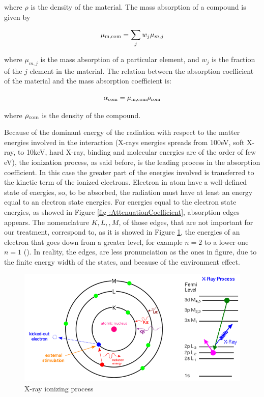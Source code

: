 \begin{flushleft}
where $\rho $ is the density of the material. The mass absorption of a compound is given by
\end{flushleft}
\begin{equation}
\mu \textsubscript{m,com} = \sum_{j} w_j \mu_{m,j}
\label{eq: mu_com}
\end{equation}
\begin{flushleft}
where $\mu_{m,j} $ is the mass absorption of a particular element, and $w_j $ is the fraction of the $j $ element in the material. The relation between the absorption coefficient of the material and the mass absorption coefficient is:
\end{flushleft}
\begin{equation}
\alpha \textsubscript{com} = \mu \textsubscript{m,com} \rho \textsubscript{com}
\label{eq: alpha com}
\end{equation}
\begin{flushleft}
where $\rho \textsubscript{com}$ is the density of the compound.
\end{flushleft}
Because of the dominant energy of the radiation with respect to the matter energies involved in the interaction (X-rays energies spreads from 100eV, soft X-ray, to 10keV, hard X-ray, binding and molecular energies are of the order of few eV), the ionization process, as said before, is the leading process in the absorption coefficient. In this case the greater part of the energies involved is transferred to the kinetic term of the ionized electrons. Electron in atom have a well-defined state of energies, so, to be absorbed, the radiation must have at least an energy equal to an electron state energies. For energies equal to the electron state energies, as showed in Figure \ref{fig :AttenuationCoefficient}, absorption edges appears. The nomenclature $K,L,,M $, of those edges, that are not important for our treatment, correspond to, as it is showed in Figure \ref{fig: KLM}, the energies of an electron that goes down from a greater level, for example $n=2 $ to a lower one $n=1 $ (\cite{agarwal1991interaction}). In reality, the edges, are less pronunciation as the ones in figure, due to the finite energy width of the states, and because of the environment effect.
\\
\begin{figure}[]
%
\centering
%
\includegraphics[width=.6\textwidth]{Immagini/Chapter1/KLM}
%
\caption{X-ray ionizing process}
%
\label{fig: KLM}
%
\end{figure}

